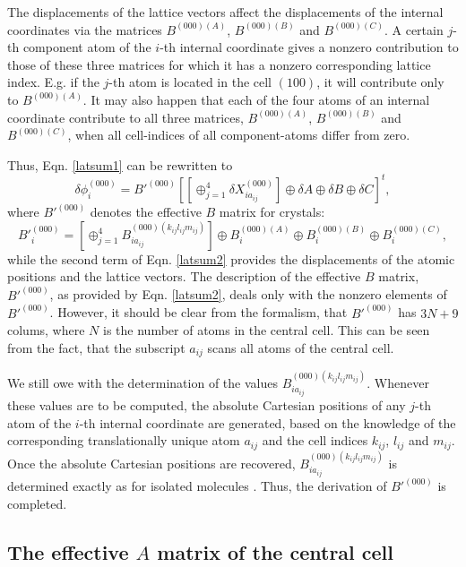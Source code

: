 \documentclass[prl,aps,preprint,superbib,12pt]{revtex4}
\begin{document}
The displacements of the lattice vectors affect the displacements
of the internal coordinates via the matrices 
$B^{(000)(A)}$, $B^{(000)(B)}$ and $B^{(000)(C)}$.
A certain $j$-th component atom of the $i$-th internal
coordinate gives a nonzero contribution to those of these three
matrices for which it has a nonzero corresponding lattice index.
E.g. if the $j$-th atom is located in the cell $(100)$,
it will contribute only to $B^{(000)(A)}$. It may also happen that
each of the four atoms of an internal coordinate contribute
to all three matrices, $B^{(000)(A)}$, $B^{(000)(B)}$ and $B^{(000)(C)}$,
when all cell-indices of all component-atoms differ from zero.

Thus, Eqn. \ref{latsum1} can be rewritten to
\begin{equation} \label{latsum2}
\delta \phi^{(000)}_{i} = 
B'^{(000)}
\left[
[\oplus_{j=1}^{4} \delta X^{(000)}_{ia_{ij}} ] 
\oplus \delta A 
\oplus \delta B 
\oplus \delta C 
\right]^{t} ,
\end{equation}
where $B'^{(000)}$ denotes the effective $B$ matrix for crystals:
\begin{equation} \label{latsum3}
B'^{(000)}_{i} =
[\oplus_{j=1}^{4}
B^{(000)(k_{ij}l_{ij}m_{ij})}_{ia_{ij}}
] \oplus B^{(000)(A)}_{i} \oplus B^{(000)(B)}_{i} \oplus B^{(000)(C)}_{i} ,
\end{equation}
while the second term of Eqn. \ref{latsum2} 
provides the displacements of the atomic positions
and the lattice vectors.
The description of the effective $B$ matrix, $B'^{(000)}$, 
as provided by Eqn. \ref{latsum2}, deals only with the
nonzero elements of $B'^{(000)}$. However, it should be clear from the
formalism, that
$B'^{(000)}$ has $3N+9$ colums, where $N$ is the number of atoms
in the central cell. This can be seen from the fact, that the subscript 
$a_{ij}$ scans all atoms of the central cell.

We still owe with the determination 
of the values $B^{(000)(k_{ij}l_{ij}m_{ij})}_{ia_{ij}}$.
Whenever these values are to be computed, the absolute Cartesian positions
of any $j$-th atom of the $i$-th internal coordinate are generated, based
on the knowledge of the corresponding translationally unique atom $a_{ij}$
and the cell indices $k_{ij}$, $l_{ij}$ and $m_{ij}$. Once the absolute
Cartesian positions are recovered, $B^{(000)(k_{ij}l_{ij}m_{ij})}_{ia_{ij}}$
is determined exactly as for isolated molecules \cite{EWilson55}. Thus,
the derivation of $B'^{(000)}$ is completed.

\subsection{The effective $A$ matrix of the central cell}
\end{document}
